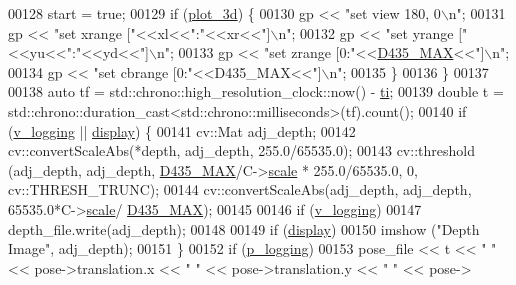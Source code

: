 \begin{DoxyCode}
{00128             start = \textcolor{keyword}{true};
00129             \textcolor{keywordflow}{if} (\hyperlink{Logging_8hpp_a90bc243756c79ffb6d9c4a4ea99c41c2}{plot\_3d}) \{
00130                 gp << \textcolor{stringliteral}{"set view 180, 0\(\backslash\)n"};
00131                 gp << \textcolor{stringliteral}{"set xrange ["}<<xl<<\textcolor{stringliteral}{":"}<<xr<<\textcolor{stringliteral}{"]\(\backslash\)n"};
00132                 gp << \textcolor{stringliteral}{"set yrange ["}<<yu<<\textcolor{stringliteral}{":"}<<yd<<\textcolor{stringliteral}{"]\(\backslash\)n"};
00133                 gp << \textcolor{stringliteral}{"set zrange [0:"}<<\hyperlink{Camera_8hpp_a525f4d6ba7971b5fc8f0bc55ea826762}{D435\_MAX}<<\textcolor{stringliteral}{"]\(\backslash\)n"};
00134                 gp << \textcolor{stringliteral}{"set cbrange [0:"}<<D435\_MAX<<\textcolor{stringliteral}{"]\(\backslash\)n"};
00135             \}
00136         \}
00137 
00138         \textcolor{keyword}{auto} tf = std::chrono::high\_resolution\_clock::now() - \hyperlink{classLogger_a7f6f65922677036ca61ba12a19fdb719}{ti};
00139         \textcolor{keywordtype}{double} t = std::chrono::duration\_cast<std::chrono::milliseconds>(tf).count();
00140         \textcolor{keywordflow}{if} (\hyperlink{Logging_8hpp_adaf32a6a0736e8e3da49a3c2b0705fa7}{v\_logging} || \hyperlink{Logging_8hpp_aae489362ce8527e1feaba93222134df3}{display}) \{
00141             cv::Mat adj\_depth;
00142             cv::convertScaleAbs(*depth, adj\_depth, 255.0/65535.0);
00143             cv::threshold (adj\_depth, adj\_depth, \hyperlink{Camera_8hpp_a525f4d6ba7971b5fc8f0bc55ea826762}{D435\_MAX}/C->\hyperlink{classCamera_a50152f7c8f2ce7601dd6086c90b3a65c}{scale} * 255.0/65535.0, 0, 
      cv::THRESH\_TRUNC);
00144             cv::convertScaleAbs(adj\_depth, adj\_depth, 65535.0*C->\hyperlink{classCamera_a50152f7c8f2ce7601dd6086c90b3a65c}{scale}/
      \hyperlink{Camera_8hpp_a525f4d6ba7971b5fc8f0bc55ea826762}{D435\_MAX});
00145 
00146             \textcolor{keywordflow}{if} (\hyperlink{Logging_8hpp_adaf32a6a0736e8e3da49a3c2b0705fa7}{v\_logging})
00147                 depth\_file.write(adj\_depth);
00148 
00149             \textcolor{keywordflow}{if} (\hyperlink{Logging_8hpp_aae489362ce8527e1feaba93222134df3}{display})
00150                 imshow (\textcolor{stringliteral}{"Depth Image"}, adj\_depth);
00151         \}
00152         \textcolor{keywordflow}{if} (\hyperlink{Logging_8hpp_a2fe143d334b5c5fd12da86fe05423074}{p\_logging})
00153             pose\_file << t << \textcolor{stringliteral}{" "} << pose->translation.x << \textcolor{stringliteral}{" "} << pose->translation.y << \textcolor{stringliteral}{" "} << pose->
}
\end{DoxyCode}
